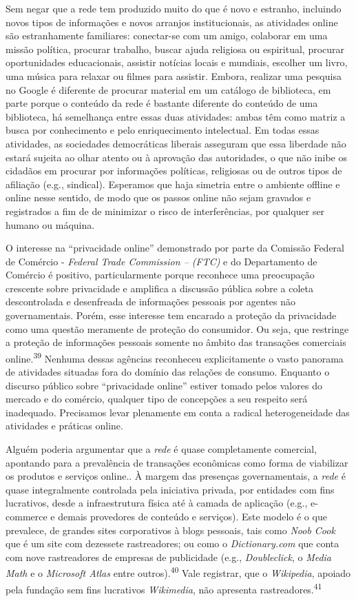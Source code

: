 Sem negar que a rede tem produzido muito do que é novo e estranho,
incluindo novos tipos de informações e novos arranjos institucionais, as
atividades online são estranhamente familiares: conectar-se com um
amigo, colaborar em uma missão política, procurar trabalho, buscar ajuda
religiosa ou espiritual, procurar oportunidades educacionais, assistir
notícias locais e mundiais, escolher um livro, uma música para relaxar
ou filmes para assistir. Embora, realizar uma pesquisa no Google é
diferente de procurar material em um catálogo de biblioteca, em parte
porque o conteúdo da rede é bastante diferente do conteúdo de uma
biblioteca, há semelhança entre essas duas atividades: ambas têm como
matriz a busca por conhecimento e pelo enriquecimento intelectual. Em
todas essas atividades, as sociedades democráticas liberais asseguram
que essa liberdade não estará sujeita ao olhar atento ou à aprovação das
autoridades, o que não inibe os cidadãos em procurar por informações
políticas, religiosas ou de outros tipos de afiliação (e.g., sindical).
Esperamos que haja simetria entre o ambiente offline e online nesse
sentido, de modo que os passos online não sejam gravados e registrados a
fim de de minimizar o risco de interferências, por qualquer ser humano
ou máquina.

O interesse na ``privacidade online'' demonstrado por parte da Comissão
Federal de Comércio - \emph{Federal Trade Commission -- (FTC)} e do
Departamento de Comércio é positivo, particularmente porque reconhece
uma preocupação crescente sobre privacidade e amplifica a discussão
pública sobre a coleta descontrolada e desenfreada de informações
pessoais por agentes não governamentais. Porém, esse interesse tem
encarado a proteção da privacidade como uma questão meramente de
proteção do consumidor. Ou seja, que restringe a proteção de informações
pessoais somente no âmbito das transações comerciais
online.\textsuperscript{{39}} Nenhuma dessas agências reconheceu
explicitamente o vasto panorama de atividades situadas fora do domínio
das relações de consumo. Enquanto o discurso público sobre ``privacidade
online'' estiver tomado pelos valores do mercado e do comércio, qualquer
tipo de concepções a seu respeito será inadequado. Precisamos levar
plenamente em conta a radical heterogeneidade das atividades e práticas
online.

Alguém poderia argumentar que a \emph{rede} é quase completamente
comercial, apontando para a prevalência de transações econômicas como
forma de viabilizar os produtos e serviços online.. À margem das
presenças governamentais, a \emph{rede} é quase integralmente controlada
pela iniciativa privada, por entidades com fins lucrativos, desde a
infraestrutura física até à camada de aplicação (e.g., e-commerce e
demais provedores de conteúdo e serviços). Este modelo é o que
prevalece, de grandes sites corporativos à blogs pessoais, tais como
\emph{Noob Cook} que é um site com dezessete rastreadores; ou como o
\emph{Dictionary.com} que conta com nove rastreadores de empresas de
publicidade (e.g., \emph{Doubleclick}, o \emph{Media Math} e o
\emph{Microsoft Atlas} entre outros).\textsuperscript{{40}} Vale
registrar, que o \emph{Wikipedia}, apoiado pela fundação sem fins
lucrativos \emph{Wikimedia}, não apresenta
rastreadores.\textsuperscript{{41}}

